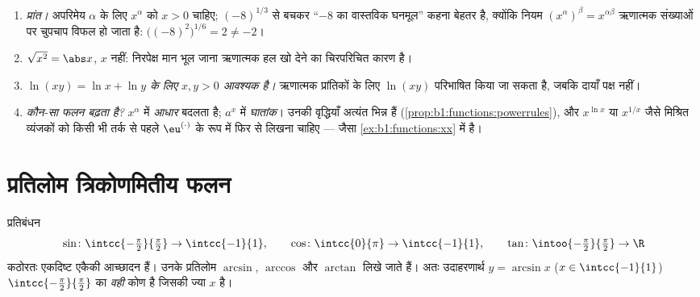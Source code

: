 \begin{remark}[घातों और लघुगणकों की सामान्य भूलें]\label{rem:b1:functions:pitfalls}
\begin{enumerate}
  \item \emph{प्रांत।} अपरिमेय $\alpha$ के लिए $x^\alpha$ को $x > 0$ चाहिए;
  $(-8)^{1/3}$ से बचकर ``$-8$ का वास्तविक घनमूल'' कहना बेहतर है, क्योंकि
  नियम $(x^\alpha)^\beta = x^{\alpha\beta}$ ऋणात्मक संख्याओं पर चुपचाप विफल
  हो जाता है: $\bigl((-8)^2\bigr)^{1/6} = 2 \neq -2$।
  \item \emph{$\sqrt{x^2} = \abs x$}, $x$ नहीं: निरपेक्ष मान भूल जाना
  ऋणात्मक हल खो देने का चिरपरिचित कारण है।
  \item \emph{$\ln(xy) = \ln x + \ln y$ के लिए $x, y > 0$ आवश्यक है।}
  ऋणात्मक प्रांतिकों के लिए $\ln(xy)$ परिभाषित किया जा सकता है, जबकि दायाँ
  पक्ष नहीं।
  \item \emph{कौन-सा फलन बढ़ता है?} $x^\alpha$ में \emph{आधार} बदलता है;
  $a^x$ में \emph{घातांक}। उनकी वृद्धियाँ अत्यंत भिन्न हैं
  (\cref{prop:b1:functions:powerrules}), और $x^{\ln x}$ या $x^{1/x}$ जैसे
  मिश्रित व्यंजकों को किसी भी तर्क से पहले $\eu^{(\cdot)}$ के रूप में फिर से
  लिखना चाहिए --- जैसा \cref{ex:b1:functions:xx} में है।
\end{enumerate}
\end{remark}

\section{प्रतिलोम त्रिकोणमितीय फलन}

\begin{definition}[$\arcsin$, $\arccos$, $\arctan$]\label{def:b1:functions:arc}
प्रतिबंधन
\[
\sin \colon \intcc{-\tfrac\pi2}{\tfrac\pi2} \to \intcc{-1}{1},
\qquad
\cos \colon \intcc{0}{\pi} \to \intcc{-1}{1},
\qquad
\tan \colon \intoo{-\tfrac\pi2}{\tfrac\pi2} \to \R
\]
कठोरतः एकदिष्ट एकैकी आच्छादन हैं। उनके प्रतिलोम 
$\arcsin$, $\arccos$ और
$\arctan$ लिखे जाते हैं। अतः उदाहरणार्थ $y =
\arcsin x$ ($x \in \intcc{-1}{1}$) $\intcc{-\frac\pi2}{\frac\pi2}$ का
\emph{वही} कोण है जिसकी ज्या $x$ है।
\end{definition}

